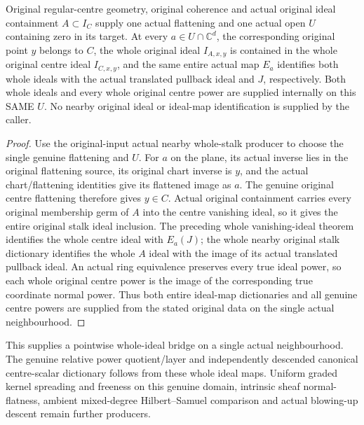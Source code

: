 \begin{theorem}
\label{hir:nearby-centre-original-same-open-whole-relative-ideal-bridge}
\leanok
Original regular-centre geometry, original coherence and actual
original ideal containment $A\subset I_C$ supply one actual flattening
and one actual open $U$ containing zero in its target. At every
$a\in U\cap\mathbb C^d$, the corresponding original point $y$ belongs
to $C$, the whole original ideal $I_{A,x,y}$ is contained in the whole
original centre ideal $I_{C,x,y}$, and the same entire actual map $E_a$
identifies both whole ideals with the actual translated pullback ideal
and $J$, respectively. Both whole ideals and every whole original
centre power are supplied internally on this SAME $U$.
No nearby original ideal or ideal-map identification is supplied by
the caller.
\end{theorem}
\begin{proof}
Use the original-input actual nearby whole-stalk producer to choose the
single genuine flattening and $U$. For $a$ on the plane, its actual
inverse lies in the original flattening source, its original chart
inverse is $y$, and the actual chart/flattening identities give its
flattened image as $a$. The genuine original centre flattening
therefore gives $y\in C$. Actual original containment carries every
original membership germ of $A$ into the centre vanishing ideal, so
it gives the entire original stalk ideal inclusion. The preceding
whole vanishing-ideal theorem identifies the whole centre ideal with
$E_a(J)$; the whole nearby original stalk dictionary identifies the
whole $A$ ideal with the image of its actual translated pullback ideal.
An actual ring equivalence preserves every true ideal power, so each
whole original centre power is the image of the corresponding true
coordinate normal power. Thus both entire ideal-map dictionaries and
all genuine centre powers are supplied from the stated original data
on the single actual neighbourhood.
\end{proof}

This supplies a pointwise whole-ideal bridge on a single actual
neighbourhood. The genuine relative power quotient/layer and
independently descended canonical centre-scalar dictionary follows
from these whole ideal maps. Uniform graded kernel spreading and
freeness on this genuine domain, intrinsic sheaf normal-flatness,
ambient mixed-degree Hilbert--Samuel comparison and actual blowing-up
descent remain further producers.
